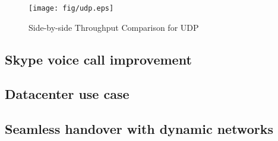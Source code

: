 \begin{figure}
\centering
\texttt{[image: fig/udp.eps]}
\caption{Side-by-side Throughput Comparison for UDP}
\label{fig.udp}
\end{figure}


\subsection{Skype voice call improvement}
\label{sec:skype}

\subsection{Datacenter use case}
\label{sec:datacenter}

\subsection{Seamless handover with dynamic networks}
\label{sec:handover}
